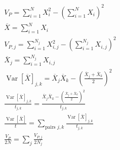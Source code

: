 \documentclass{article}
\DeclareMathOperator{\Var}{\text{Var}}
\newcommand{\Ne}{N}
\newcommand{\VarPhenotype}{V_{P}}
\newcommand{\VarPhenotypej}{V_{P, j}}
\newcommand{\Trait}{X}
\begin{document}
\begin{gather*}
    \VarPhenotype = \sum_{i=1}^{\Ne} \Trait_{i}^2 - \left( \sum_{i=1}^{\Ne} \Trait_{i} \right)^2 \\
    \overline{\Trait} = \sum_{i=1}^{\Ne} \Trait_{i} \\
    \VarPhenotypej = \sum_{i=1}^{\Ne_{j}} \Trait_{i,j}^2 - \left( \sum_{i=1}^{\Ne_{j}} \Trait_{i,j} \right)^2 \\
    \overline{\Trait}_{j} = \sum_{i=1}^{\Ne_{j}} \Trait_{i,j} \\
    \Var \left[ \overline{\Trait}\right]_{j,k} = \overline{\Trait}_{j} \overline{\Trait}_{k} - \left( \frac{\overline{\Trait}_{j} + \overline{\Trait}_{k}}{2} \right)^2  \\
    \frac{\Var \left[ \overline{\Trait}\right]_{j,k}}{t_{j,k}} = \frac{\overline{\Trait}_{j} \overline{\Trait}_{k} - \left( \frac{\overline{\Trait}_{j} + \overline{\Trait}_{k}}{2} \right)^2}{t_{j,k}}  \\
    \frac{\Var \left[ \overline{\Trait}\right]}{t} = \sum_{\text{pairs }j, k}\frac{\Var \left[ \overline{\Trait }\right]_{j,k}}{t_{j,k}} \\
    \frac{\VarPhenotype}{2 \Ne}  = \sum_{j} \frac{\VarPhenotypej}{2 \Ne _{j}} \\
\end{gather*}

\newpage
\end{document}
